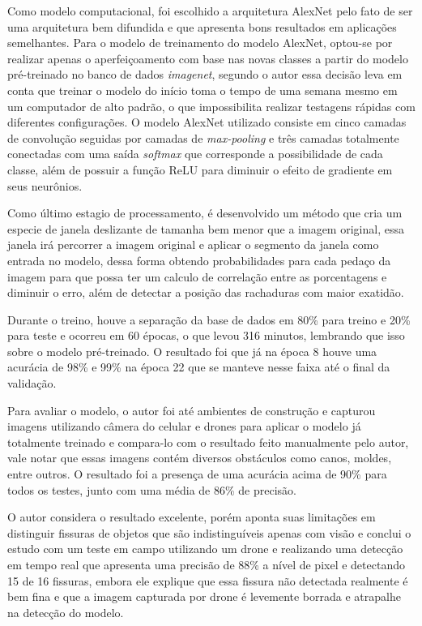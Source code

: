 Como modelo computacional, foi escolhido a arquitetura AlexNet pelo fato de ser uma arquitetura bem difundida e que apresenta bons resultados em aplicações semelhantes. 
Para o modelo de treinamento do modelo AlexNet, optou-se por realizar apenas o aperfeiçoamento com base nas novas classes a partir do modelo pré-treinado no banco de dados \textit{imagenet}, segundo o autor essa decisão leva em conta que treinar o modelo do início toma o tempo de uma semana mesmo em um computador de alto padrão, o que impossibilita realizar testagens rápidas com diferentes configurações. O modelo AlexNet utilizado consiste em cinco camadas de convolução seguidas por camadas de \textit{max-pooling} e três camadas totalmente conectadas com uma saída \textit{softmax} que corresponde a possibilidade de cada classe, além de possuir a função ReLU para diminuir o efeito de gradiente em seus neurônios.

Como último estagio de processamento, é desenvolvido um método que cria um especie de janela deslizante de tamanha bem menor que a imagem original, essa janela irá percorrer a imagem original e aplicar o segmento da janela como entrada no modelo, dessa forma obtendo probabilidades para cada pedaço da imagem para que possa ter um calculo de correlação entre as porcentagens e diminuir o erro, além de detectar a posição das rachaduras com maior exatidão.

Durante o treino, houve a separação da base de dados em 80\% para treino e 20\% para teste e ocorreu em 60 épocas, o que levou 316 minutos, lembrando que isso sobre o modelo pré-treinado. O resultado foi que já na época 8 houve uma acurácia de 98\% e 99\% na época 22 que se manteve nesse faixa até o final da validação.

Para avaliar o modelo, o autor foi até ambientes de construção e capturou imagens utilizando câmera do celular e drones para aplicar o modelo já totalmente treinado e compara-lo com o resultado feito manualmente pelo autor, vale notar que essas imagens contém diversos obstáculos como canos, moldes, entre outros. O resultado foi a presença de uma acurácia acima de 90\% para todos os testes, junto com uma média de 86\% de precisão.

O autor considera o resultado excelente, porém aponta suas limitações em distinguir fissuras de objetos que são indistinguíveis apenas com visão e conclui o estudo com um teste em campo utilizando um drone e realizando uma detecção em tempo real que apresenta uma precisão de 88\% a nível de pixel e detectando 15 de 16 fissuras, embora ele explique que essa fissura não detectada realmente é bem fina e que a imagem capturada por drone é levemente borrada e atrapalhe na detecção do modelo.

